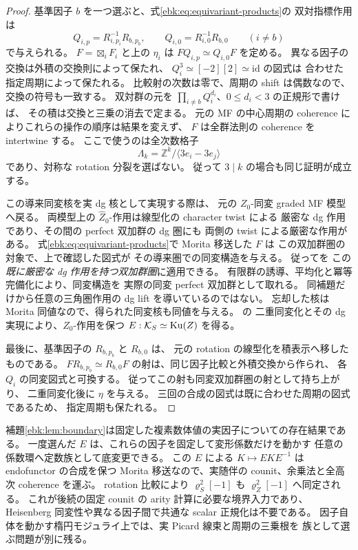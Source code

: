 \begin{proof}
基準因子 $b$ を一つ選ぶと、式\eqref{ebk:eq:equivariant-products}の
双対指標作用は
\[
 Q_{i,p}=R_{i,p_i}^{-1}R_{b,p_b},\qquad
 Q_{i,0}=R_{i,0}^{-1}R_{b,0}\qquad(i\ne b)
\]
で与えられる。
$F=\boxtimes_iF_i$ と上の $\eta_i$ は
$FQ_{i,p}\simeq Q_{i,0}F$ を定める。
異なる因子の交換は外積の交換則によって保たれ、
$Q_i^3\simeq[-2][2]\simeq\mathrm{id}$ の図式は
合わせた指定周期によって保たれる。
比較射の次数は零で、周期の shift は偶数なので、交換の符号も一致する。
双対群の元を $\prod_{i\ne b}Q_i^{d_i}$、$0\le d_i<3$ の正規形で書けば、
その積は交換と三乗の消去で定まる。
元の MF の中心周期の coherence によりこれらの操作の順序は結果を変えず、
$F$ は全群法則の coherence を intertwine する。
ここで使うのは全次数格子
\[
 \Lambda_k=\mathbb Z^k/\langle3e_i-3e_j\rangle
\]
であり、対称な rotation 分裂を選ばない。
従って $3\mid k$ の場合も同じ証明が成立する。

この導来同変核を実 dg 核として実現する際は、
元の $Z_0$-同変 graded MF 模型へ戻る。
両模型上の $\widehat Z_0$-作用は線型化の character twist による
厳密な dg 作用であり、その間の perfect 双加群の dg 圏にも
両側の twist による厳密な作用がある。
式\eqref{ebk:eq:equivariant-products}で Morita 移送した $F$ は
この双加群圏の対象で、上で確認した図式が
その導来圏での同変構造を与える。
従って\cite[Lemma~8.6]{MEDElagin}を
この\emph{既に厳密な dg 作用を持つ双加群圏}に適用できる。
有限群の誘導、平均化と冪等完備化により、同変構造を
実際の同変 perfect 双加群として取れる。
同補題だけから任意の三角圏作用の dg lift を導いているのではない。
忘却した核は Morita 同値なので、得られた同変核も同値を与える。
\cite[Theorem~4.2, Theorems~8.7 and~8.9]{MEDElagin}の
二重同変化とその dg 実現により、$Z_0$-作用を保つ
$E:\mathcal K_S\simeq\operatorname{Ku}(Z)$ を得る。

最後に、基準因子の $R_{b,p_b}$ と $R_{b,0}$ は、
元の rotation の線型化を積表示へ移したものである。
$FR_{b,p_b}\simeq R_{b,0}F$ の射は、同じ因子比較と外積交換から作られ、
各 $Q_i$ の同変図式と可換する。
従ってこの射も同変双加群圏の射として持ち上がり、
二重同変化後に $\eta$ を与える。
三回の合成の図式は既に合わせた周期の図式であるため、
指定周期も保たれる。
\end{proof}

\begin{remark}
\label{ebk:rem:scope}
補題\ref{ebk:lem:boundary}は固定した複素数体値の実因子についての存在結果である。
一度選んだ $E$ は、これらの因子を固定して変形係数だけを動かす
任意の係数環へ定数族として底変更できる。
この $E$ による $K\mapsto EKE^{-1}$ は endofunctor の合成を保つ
Morita 移送なので、実随伴の counit、余乗法と全高次 coherence を運ぶ。
rotation 比較により $\varrho_S^2[-1]$ も
$\varrho_Z^2[-1]$ へ同定される。
これが後続の固定 counit の arity 計算に必要な境界入力であり、
Heisenberg 同変性や異なる因子間で共通な scalar 正規化は不要である。
因子自体を動かす楕円モジュライ上では、実 Picard 線束と周期の三乗根を
族として選ぶ問題が別に残る。
\end{remark}
